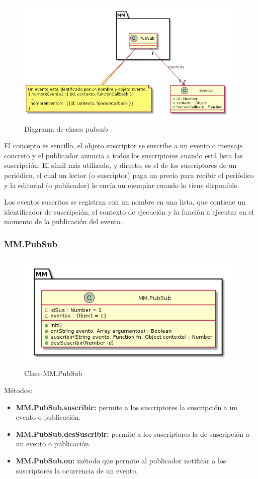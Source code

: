 \begin{figure}[tbph]
\centering
\includegraphics[width=\linewidth]{imagenes/diagrama-clases-mm-pubsub}
\caption{Diagrama de clases pubsub}
\label{fig:diagrama-clases-mm-pubsub}
\end{figure}


El concepto es sencillo, el objeto suscriptor se suscribe a un evento o mensaje concreto y el publicador anuncia a todos los 
suscriptores cuando está lista las suscripción. El símil más utilizado, y directo, es el de los suscriptores de un periódico, 
el cual un lector (o suscriptor) paga un precio para recibir el periódico y la editorial (o publicador) le envía un ejemplar 
cuando lo tiene disponible. 


Los eventos suscritos se registran con un nombre en una lista, que contiene un identificador de suscripción, el contexto de 
ejecución y la función a ejecutar en el momento de la publicación del evento.

\subsubsection{MM.PubSub}
\begin{figure}[tbph]
\centering
\includegraphics[width=0.5\linewidth]{imagenes/diagrama-clase-mm-pubsub}
\caption{Clase MM.PubSub}
\label{fig:diagrama-clase-mm-pubsub}
\end{figure}

Métodos:
\begin{itemize}
\item \textbf{MM.PubSub.suscribir:} permite a los suscriptores la suscripción a un evento o publicación.
\item \textbf{MM.PubSub.desSuscribir:} permite a los suscriptores la de suscripción a un evento o publicación.
\item \textbf{MM.PubSub.on:} método que permite al publicador notificar a los suscriptores
la ocurrencia de un evento. 
\end{itemize}





